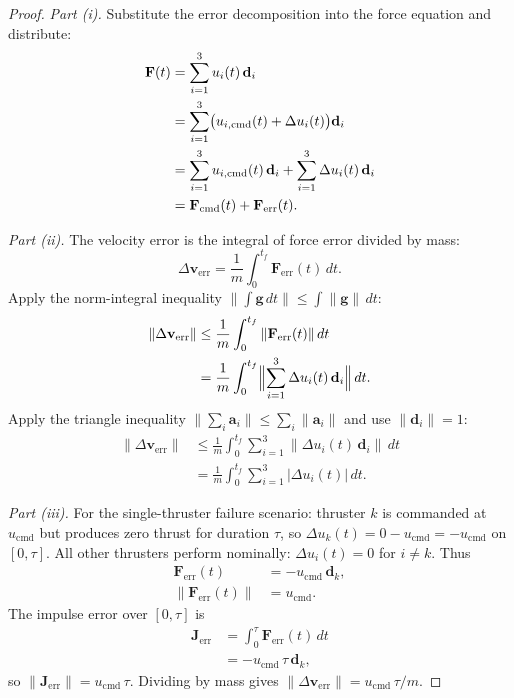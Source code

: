 \documentclass{article}
\begin{document}
\begin{proof}
\emph{Part (i).}
Substitute the error decomposition into the force equation and distribute:
\begin{align}
\mathbf F(t)
&= \sum_{i=1}^{3} u_i(t)\,\mathbf d_i \notag \\
&= \sum_{i=1}^{3} \bigl(u_{i,\mathrm{cmd}}(t) + \Delta u_i(t)\bigr)\mathbf d_i \notag \\
&= \sum_{i=1}^{3} u_{i,\mathrm{cmd}}(t)\,\mathbf d_i 
   + \sum_{i=1}^{3} \Delta u_i(t)\,\mathbf d_i \notag \\
&= \mathbf F_{\mathrm{cmd}}(t) + \mathbf F_{\mathrm{err}}(t).
\end{align}

\emph{Part (ii).}
The velocity error is the integral of force error divided by mass:
\[
\Delta \mathbf v_{\mathrm{err}} 
= \frac{1}{m} \int_0^{t_f} \mathbf F_{\mathrm{err}}(t)\,dt.
\]
Apply the norm-integral inequality $\bigl\|\int \mathbf g\,dt\bigr\| \le \int \|\mathbf g\|\,dt$:
\[
\begin{aligned}
\|\Delta \mathbf v_{\mathrm{err}}\|
&\le \frac{1}{m} \int_0^{t_f} \|\mathbf F_{\mathrm{err}}(t)\|\,dt \\
&= \frac{1}{m} \int_0^{t_f} \Bigl\|\sum_{i=1}^{3} \Delta u_i(t)\,\mathbf d_i\Bigr\|\,dt.
\end{aligned}
\]
Apply the triangle inequality $\|\sum_i \mathbf a_i\| \le \sum_i \|\mathbf a_i\|$ and use 
$\|\mathbf d_i\| = 1$:
\[
\begin{aligned}
\|\Delta \mathbf v_{\mathrm{err}}\|
&\le \frac{1}{m} \int_0^{t_f} \sum_{i=1}^{3} \|\Delta u_i(t)\,\mathbf d_i\|\,dt \\
&= \frac{1}{m} \int_0^{t_f} \sum_{i=1}^{3} |\Delta u_i(t)|\,dt.
\end{aligned}
\]

\emph{Part (iii).}
For the single-thruster failure scenario: thruster $k$ is commanded at $u_{\mathrm{cmd}}$ but 
produces zero thrust for duration $\tau$, so $\Delta u_k(t) = 0 - u_{\mathrm{cmd}} = -u_{\mathrm{cmd}}$ 
on $[0, \tau]$. All other thrusters perform nominally: $\Delta u_i(t) = 0$ for $i \neq k$. Thus
\[
\begin{aligned}
\mathbf F_{\mathrm{err}}(t) &= -u_{\mathrm{cmd}}\,\mathbf d_k, \\
\|\mathbf F_{\mathrm{err}}(t)\| &= u_{\mathrm{cmd}}.
\end{aligned}
\]
The impulse error over $[0, \tau]$ is
\[
\begin{aligned}
\mathbf J_{\mathrm{err}} 
&= \int_0^\tau \mathbf F_{\mathrm{err}}(t)\,dt \\
&= -u_{\mathrm{cmd}}\,\tau\,\mathbf d_k,
\end{aligned}
\]
so $\|\mathbf J_{\mathrm{err}}\| = u_{\mathrm{cmd}}\,\tau$. Dividing by mass gives 
$\|\Delta \mathbf v_{\mathrm{err}}\| = u_{\mathrm{cmd}}\,\tau / m$.
\end{proof}
\end{document}
